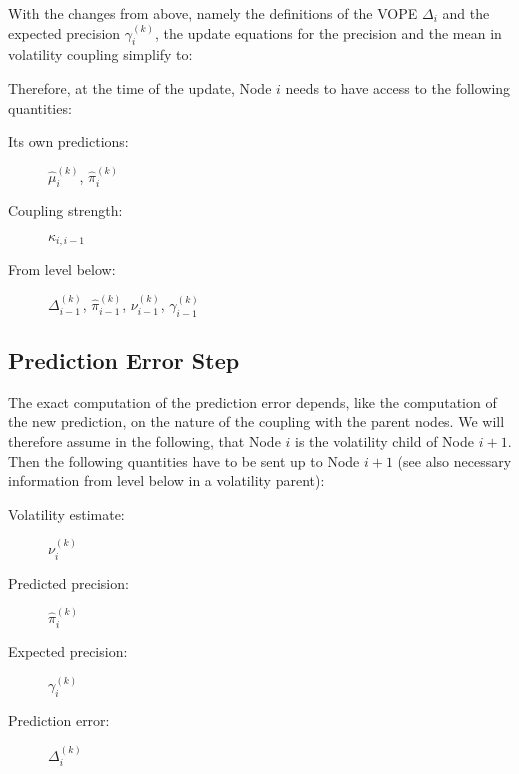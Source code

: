 With the changes from above, namely the definitions of the \textsf{VOPE} $\Delta_i$ and the expected precision $\gamma_i^{(k)}$, the update equations for the precision and the mean in volatility coupling simplify to:
\vspace{0.5cm}

\noindent
{}%
\vspace{0.5cm}

\noindent
Therefore, at the time of the update, Node $i$ needs to have access to the following quantities:

\begin{description}
\item[Its own predictions:]  	$\hat{\mu}_i^{(k)}$, $\hat{\pi}_i^{(k)}$
\item[Coupling strength:] 		$\kappa_{i,i-1}$
\item[From level below:]		$\Delta_{i-1}^{(k)}$, $\hat{\pi}_{i-1}^{(k)}$, 
								$\nu_{i-1}^{(k)}$, $\gamma_{i-1}^{(k)}$
\end{description}


\subsection{Prediction Error Step}
The exact computation of the prediction error depends, like the computation of the new prediction, on the nature of the coupling with the parent nodes. We will therefore assume in the following, that Node $i$ is the volatility child of Node $i+1$. Then the following quantities have to be sent up to Node $i+1$ (see also necessary information from level below in a volatility parent):

\begin{description}
\item[Volatility estimate:]  	$\nu_i^{(k)}$
\item[Predicted precision:] 	$\hat{\pi}_{i}^{(k)}$
\item[Expected precision:] 		$\gamma_{i}^{(k)}$
\item[Prediction error:]		$\Delta_{i}^{(k)}$
\end{description}

